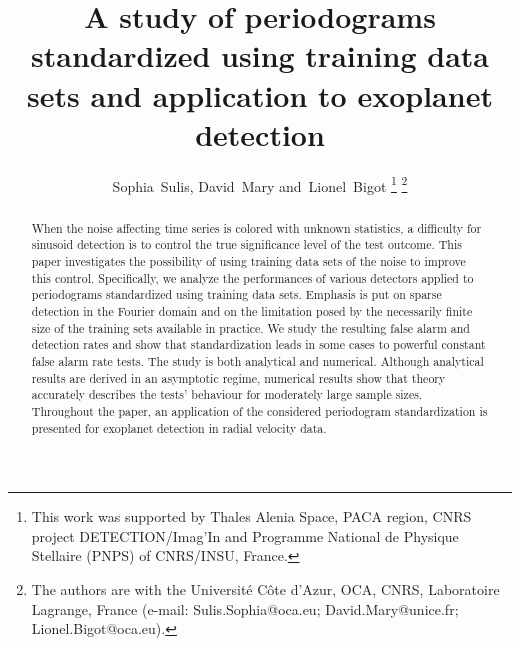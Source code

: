 \documentclass[journal]{IEEEtran}
\begin{document}
\title{A study of  periodograms standardized using training data sets  and application to exoplanet detection}
\author{Sophia~Sulis, David~Mary and~Lionel~Bigot
\thanks{This work was supported by Thales Alenia Space, PACA region, CNRS project DETECTION/Imag'In and Programme National de Physique Stellaire (PNPS) of CNRS/INSU, France.}
\thanks{ The authors are with the  Universit\'e C\^ote d'Azur, OCA, CNRS, Laboratoire Lagrange, France
  (e-mail: Sulis.Sophia@oca.eu; David.Mary@unice.fr; Lionel.Bigot@oca.eu).}}

 

\maketitle
{}

\begin{abstract}
	When the noise affecting time series is colored with unknown statistics, a difficulty for sinusoid detection  is to control the true significance level of the test outcome.
	This paper investigates the possibility of using training data sets of  the noise to improve this control. 
	Specifically, we analyze the performances of various detectors {applied to} periodograms standardized using training  data sets. Emphasis is put on sparse detection in the Fourier domain and on the limitation posed by  the necessarily finite size of the training  sets available in practice. We study  the resulting false alarm and detection rates and show that  standardization leads in some cases to powerful constant false alarm rate tests.
	The study is both analytical and numerical.   Although analytical results are derived in an asymptotic regime, numerical  results show that theory accurately describes the tests'  behaviour for moderately large sample sizes. 
	{Throughout the paper, an application of the considered periodogram standardization  is presented  for exoplanet detection in radial velocity data.}
\end{abstract}
\end{document}
